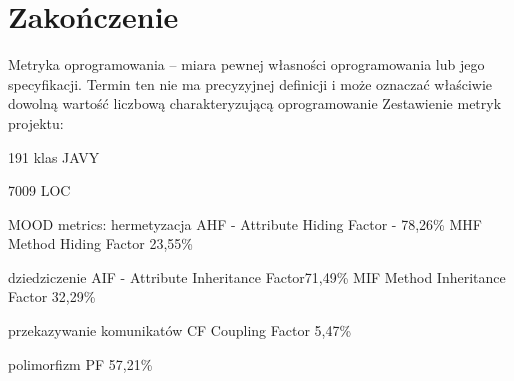 \chapter{Zakończenie}
\label{cha:zakonczenie}

Metryka oprogramowania – miara pewnej własności oprogramowania lub jego specyfikacji. Termin ten nie ma precyzyjnej definicji i może oznaczać właściwie dowolną wartość liczbową charakteryzującą oprogramowanie
Zestawienie metryk projektu:

191 klas JAVY

7009 LOC

MOOD metrics:
hermetyzacja
AHF - Attribute Hiding Factor - 78,26\%
MHF Method Hiding Factor 23,55\%

dziedziczenie
AIF - Attribute Inheritance Factor71,49\%
MIF Method Inheritance Factor  32,29\%

przekazywanie komunikatów 
CF Coupling Factor 5,47\%

polimorfizm
PF 57,21\%
